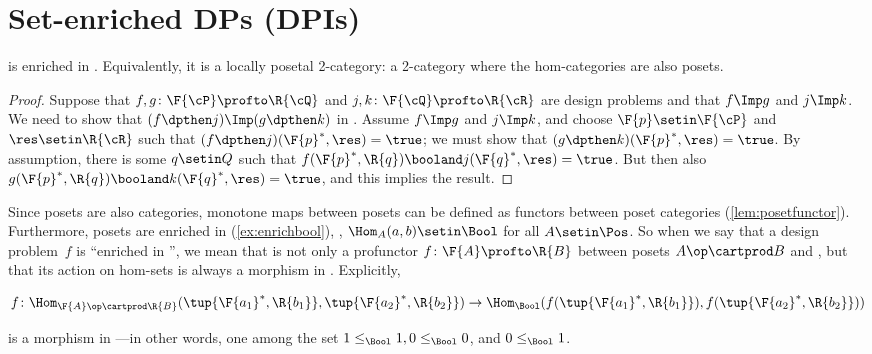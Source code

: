 
\section{Set-enriched DPs (DPIs)}

\begin{proposition}
    \label{prop:DP_loc_pos}
    \DP is enriched in \Pos.
    Equivalently, it is a locally posetal 2-category: a 2-category where the hom-categories are also posets.
\end{proposition}
\begin{proof}
    Suppose that $f,g\colon \F{\cP} \profto \R{\cQ}$ and $j,k\colon \F{\cQ} \profto \R{\cR}$ are design problems and that $f\Imp g$ and $j\Imp k$.
    We need to show that $(f\dpthen j)\Imp(g\dpthen k)$ in \DP.
    Assume $f\Imp g$ and $j\Imp k$, and choose $\F{p}\setin\F{\cP} $ and $\res\setin\R{\cR}$ such that $(f\dpthen j)(\F{p}^*,\res)=\true$; we must show that $(g \dpthen k)(\F{p}^*,\res)=\true$.
    By assumption, there is some $q\setin Q$ such that $f(\F{p}^*,\R{q})\booland j(\F{q}^*,\res)=\true$.
    But then also $g(\F{p}^*,\R{q})\booland k(\F{q}^*,\res)=\true$, and this implies the result.
\end{proof}
Since posets are also categories, monotone maps between posets can be defined as functors between poset categories (\cref{lem:posetfunctor}).
Furthermore, posets are enriched in \Bool (\cref{ex:enrichbool}), \ie, $\Hom_A(a,b) \setin \Bool$ for all $A \setin \Pos$.
So when we say that a design problem~$f$ is ``enriched in \Bool'', we mean that is not only a profunctor $f \colon \F{A} \profto \R{B}$ between posets $A\op \cartprod B$ and \Bool, but that its action on hom-sets is always a morphism in \Bool.
Explicitly,

\begin{widepar}
    \begin{equation}
        f \colon \Hom_{\F{A}\op \cartprod \R{B}}(\tup{\F{a_1}^*,\R{b_1}}, \tup{\F{a_2}^*,\R{b_2}}) \to \Hom_\Bool(f(\tup{\F{a_1}^*,\R{b_1}}), f(\tup{\F{a_2}^*,\R{b_2}}))
    \end{equation}
\end{widepar}
is a morphism in \Bool---in other words, one among the set $1 \leq_\Bool 1, 0 \leq_\Bool 0$, and $0 \leq_\Bool 1$.


